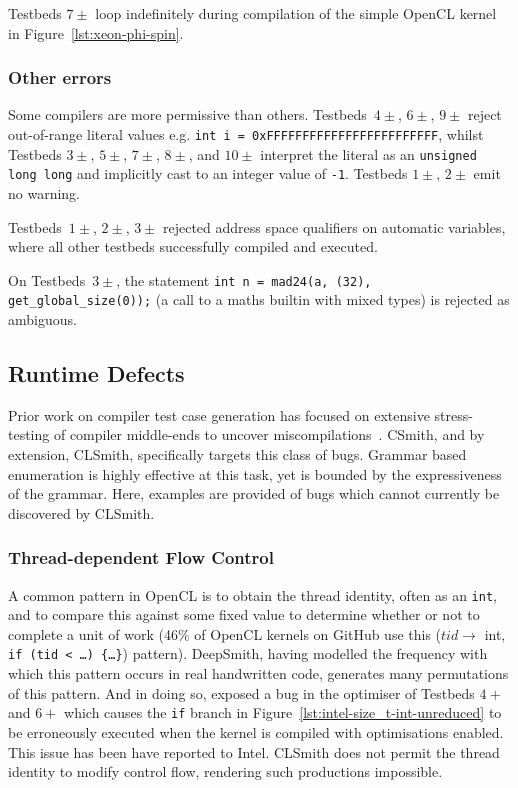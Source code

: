 Testbeds $7\pm$ loop indefinitely during compilation of the simple OpenCL kernel in Figure~\ref{lst:xeon-phi-spin}.

\subsubsection{Other errors}

Some compilers are more permissive than others. Testbeds~$4\pm$, $6\pm$, $9\pm$ reject out-of-range literal values e.g. \texttt{int i = 0xFFFFFFFFFFFFFFFFFFFFFFFF}, whilst Testbeds $3\pm$, $5\pm$, $7\pm$, $8\pm$, and $10\pm$ interpret the literal as an \texttt{unsigned long long} and implicitly cast to an integer value of \texttt{-1}. Testbeds $1\pm$, $2\pm$ emit no warning.

Testbeds~$1\pm$, $2\pm$, $3\pm$ rejected address space qualifiers on automatic variables, where all other testbeds successfully compiled and executed.

On Testbeds~$3\pm$, the statement \texttt{int n = mad24(a, (32), get\_global\_size(0));} (a call to a maths builtin with mixed types) is rejected as ambiguous.


\subsection{Runtime Defects}

Prior work on compiler test case generation has focused on extensive stress-testing of compiler middle-ends to uncover miscompilations~\cite{Chen2014a}. CSmith, and by extension, CLSmith, specifically targets this class of bugs. Grammar based enumeration is highly effective at this task, yet is bounded by the expressiveness of the grammar. Here, examples are provided of bugs which cannot currently be discovered by CLSmith.


\subsubsection{Thread-dependent Flow Control}

A common pattern in OpenCL is to obtain the thread identity, often as an \texttt{int}, and to compare this against some fixed value to determine whether or not to complete a unit of work (46\% of OpenCL kernels on GitHub use this ($tid \rightarrow$ int, \texttt{if (tid < \ldots) \{\ldots\}}) pattern). DeepSmith, having modelled the frequency with which this pattern occurs in real handwritten code, generates many permutations of this pattern. And in doing so, exposed a bug in the optimiser of Testbeds $4+$ and $6+$ which causes the \texttt{if} branch in Figure~\ref{lst:intel-size_t-int-unreduced} to be erroneously executed when the kernel is compiled with optimisations enabled. This issue has been have reported to Intel. CLSmith does not permit the thread identity to modify control flow, rendering such productions impossible.

